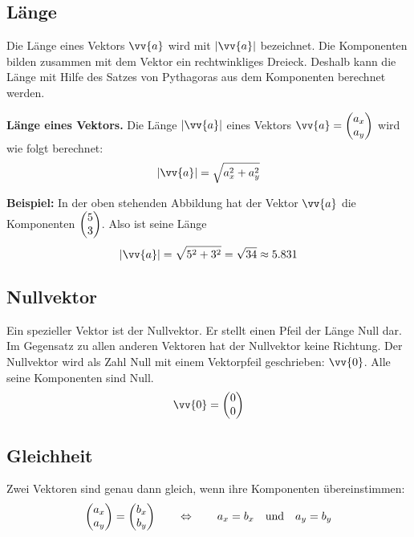 \subsection{Länge}

Die Länge eines Vektors $\vv{a}$ wird mit $|\vv{a}|$ bezeichnet. Die Komponenten bilden zusammen mit dem Vektor ein rechtwinkliges Dreieck. Deshalb kann die Länge mit Hilfe des Satzes von Pythagoras aus dem Komponenten berechnet werden.

\begin{center}
\end{center}

\begin{theorem}
  \textbf{Länge eines Vektors.} Die Länge $|\vv{a}|$ eines Vektors $\vv{a} = \vxy{a_{x},a_{y}}$ wird wie folgt berechnet:
  \[
    |\vv{a}| = \sqrt{a_{x}^{2}+a_{y}^{2}}
  \]
\end{theorem}

\begin{example}
  \textbf{Beispiel:} In der oben stehenden Abbildung hat der Vektor $\vv{a}$ die Komponenten $\vxy{5,3}$. Also ist seine Länge
  \[
    |\vv{a}| = \sqrt{5^{2}+3^{2}} = \sqrt{34} \approx 5.831
  \]
\end{example}

\subsection{Nullvektor}

Ein spezieller Vektor ist der Nullvektor. Er stellt einen Pfeil der Länge Null dar. Im Gegensatz zu allen anderen Vektoren hat der Nullvektor keine Richtung. Der Nullvektor wird als Zahl Null mit einem Vektorpfeil geschrieben: $\vv{0}$. Alle seine Komponenten sind Null.
\[
  \vv{0} = \vxy{0,0}
\]

\subsection{Gleichheit}

Zwei Vektoren sind genau dann gleich, wenn ihre Komponenten übereinstimmen:
\[
  \vxy{a_{x},a_{y}} = \vxy{b_{x},b_{y}} \qquad\Leftrightarrow\qquad a_{x} = b_{x} \quad\text{und}\quad a_{y} = b_{y}
\]